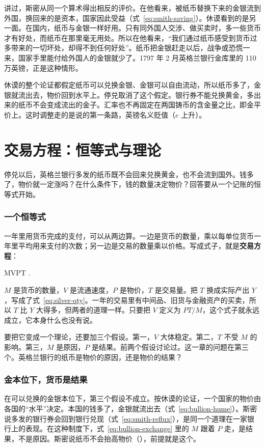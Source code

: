 讲过，斯密从同一个算术得出相反的评价。在他看来，被纸币替换下来的金银流到外国，换回来的是资本，国家因此受益（式~\eqref{eq:smith-saving}）。休谟看到的是另一面。在国内，纸币与金银一样好用。只有同外国人交涉、做买卖时，多一些货币才有好处，而纸币在那里毫无用处。所以在他看来，“我们通过纸币感受到货币过多带来的一切坏处，却得不到任何好处”\cite{hume1752}。纸币把金银赶走以后，战争或恐慌一来，国家手里能付给外国人的金银就少了。1797 年 2 月英格兰银行金库里的 110 万英镑，正是这种情形。

休谟的整个论证都假定纸币可以兑换金银、金银可以自由流动，所以纸币多了，金银就流出去，物价回到水平上。停兑取消了这个假定。银行券不能兑换黄金，多出来的纸币不会变成流出的金子。汇率也不再固定在两国铸币的含金量之比，即金平价上。这时调整走的是说的第一条路，英镑名义贬值（$e$ 上升）。

\section{交易方程：恒等式与理论}\label{sec:bullion-equation}

停兑以后，英格兰银行多发的纸币既不会回来兑换黄金，也不会流到国外。钱多了，物价就一定涨吗？在什么条件下，钱的数量决定物价？回答要从一个记账的恒等式开始。

\subsubsection{一个恒等式}
一年里用货币完成的支付，可以从两边算。一边是货币的数量，乘以每单位货币一年里平均用来支付的次数；另一边是交易的数量乘以价格。写成式子，就是\textbf{交易方程}：
\begin{keyeq}
MV\equiv PT .\label{eq:bullion-exchange}
\end{keyeq}
$M$ 是货币的数量，$V$ 是流通速度，$P$ 是物价，$T$ 是交易量。把 $T$ 换成实际产出 $Y$，写成了式~\eqref{eq:silver-qty}。一年的交易里有中间品、旧货与金融资产的买卖，所以 $T$ 比 $Y$ 大得多，但两者的道理一样。只要把 $V$ 定义为 $PT/M$，这个式子就永远成立，它本身什么也没有说。

要把它变成一个理论，还要加三个假设。第一，$V$ 大体稳定。第二，$T$ 不受 $M$ 的影响。第三，$M$ 是原因，$P$ 是结果。前两个假设讨论过。这一章的问题在第三个。英格兰银行的纸币是物价的原因，还是物价的结果？

\subsubsection{金本位下，货币是结果}
在可以兑换的金银本位下，第三个假设不成立。按休谟的论证，一个国家的物价由各国的“水平”决定。本国的钱多了，金银就流出去（式~\eqref{eq:bullion-hume}）。斯密说多发的银行券会回到银行兑现（式~\eqref{eq:smith-reflux}），是同一个道理在一家银行上的表现。在这种制度下，式~\eqref{eq:bullion-exchange} 里的 $M$ 跟着 $P$ 走，是结果，不是原因。斯密说纸币不会抬高物价（），前提就是这个。

